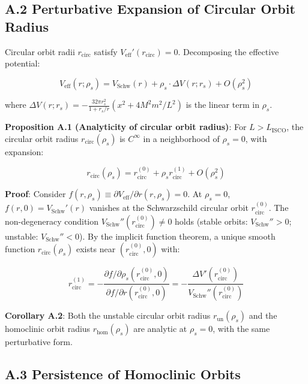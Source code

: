 \documentclass[12pt]{article}
\begin{document}
\subsection{A.2 Perturbative Expansion of Circular Orbit Radius}

Circular orbit radii $r_{\text{circ}}$ satisfy $V_{\text{eff}}'(r_{\text{circ}}) = 0$. Decomposing the effective potential:

\begin{equation}
V_{\text{eff}}(r; \rho_s) = V_{\text{Schw}}(r) + \rho_s \cdot \Delta V(r; r_s) + O(\rho_s^2)
\end{equation}

where $\Delta V(r; r_s) = -\frac{32\pi r_s^2}{1+r_s/r}(x^2 + 4M^2 m^2/L^2)$ is the linear term in $\rho_s$.

\textbf{Proposition A.1 (Analyticity of circular orbit radius)}: For $L > L_{\text{ISCO}}$, the circular orbit radius $r_{\text{circ}}(\rho_s)$ is $C^\infty$ in a neighborhood of $\rho_s = 0$, with expansion:

\begin{equation}
r_{\text{circ}}(\rho_s) = r_{\text{circ}}^{(0)} + \rho_s r_{\text{circ}}^{(1)} + O(\rho_s^2)
\end{equation}

\textbf{Proof}: Consider $f(r, \rho_s) \equiv \partial V_{\text{eff}}/\partial r(r, \rho_s) = 0$. At $\rho_s = 0$, $f(r, 0) = V_{\text{Schw}}'(r)$ vanishes at the Schwarzschild circular orbit $r_{\text{circ}}^{(0)}$. The non-degeneracy condition $V_{\text{Schw}}''(r_{\text{circ}}^{(0)}) \neq 0$ holds (stable orbits: $V_{\text{Schw}}'' > 0$; unstable: $V_{\text{Schw}}'' < 0$). By the implicit function theorem, a unique smooth function $r_{\text{circ}}(\rho_s)$ exists near $(r_{\text{circ}}^{(0)}, 0)$ with:

\begin{equation}
r_{\text{circ}}^{(1)} = -\frac{\partial f / \partial \rho_s (r_{\text{circ}}^{(0)}, 0)}{\partial f / \partial r (r_{\text{circ}}^{(0)}, 0)} = -\frac{\Delta V'(r_{\text{circ}}^{(0)})}{V_{\text{Schw}}''(r_{\text{circ}}^{(0)})}
\end{equation}

\textbf{Corollary A.2}: Both the unstable circular orbit radius $r_{\text{un}}(\rho_s)$ and the homoclinic orbit radius $r_{\text{hom}}(\rho_s)$ are analytic at $\rho_s = 0$, with the same perturbative form.

\subsection{A.3 Persistence of Homoclinic Orbits}
\end{document}
